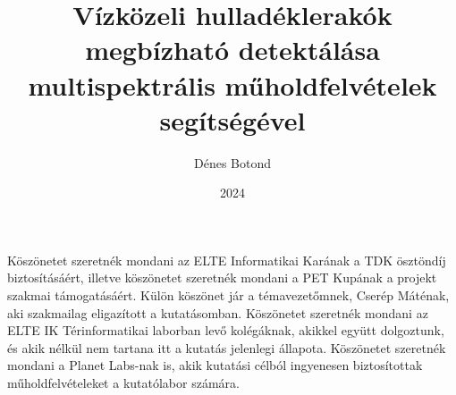 \documentclass[
]{elteiktdk}[2023/04/10]
\title{Vízközeli hulladéklerakók megbízható detektálása multispektrális műholdfelvételek segítségével}
\date{2024}
\author{Dénes Botond}
\affiliation{egyetemi tanársegéd}
\begin{document}


\makecover
\cleardoublepage
\maketitle

\tableofcontents
\cleardoublepage


\cleardoublepage


\cleardoublepage


\cleardoublepage


\cleardoublepage




\cleardoublepage


\cleardoublepage

\chapter*{\acklabel}
Köszönetet szeretnék mondani az ELTE Informatikai Karának a TDK ösztöndíj biztosításáért, illetve köszönetet szeretnék mondani a PET Kupának a projekt szakmai támogatásáért. Külön köszönet jár a témavezetőmnek, Cserép Máténak, aki szakmailag eligazított a kutatásomban. Köszönetet szeretnék mondani az ELTE IK Térinformatikai laborban levő kolégáknak, akikkel együtt dolgoztunk, és akik nélkül nem tartana itt a kutatás jelenlegi állapota. Köszönetet szeretnék mondani a Planet Labs-nak is, akik kutatási célból ingyenesen biztosítottak műholdfelvételeket a kutatólabor számára.


\appendix

\cleardoublepage

{}
\printbibliography[title=\biblabel]
\cleardoublepage

{}
\listoffigures
\cleardoublepage

{}
\listoftables
\cleardoublepage

{}
\listofalgorithms
\cleardoublepage

{}
\lstlistoflistings
\cleardoublepage

\end{document}
